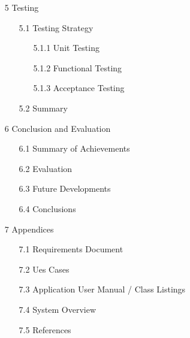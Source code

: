 \documentclass{article}
\begin{document}
\begin{itemize}
\begin{itemize}
\begin{itemize}
		\end{itemize}
	\end{itemize}
	\item [5] Testing
	\begin{itemize}
		\item [5.1] Testing Strategy
		\begin{itemize}
			\item [5.1.1] Unit Testing
			\item [5.1.2] Functional Testing
			\item [5.1.3] Acceptance Testing
		\end{itemize}
		\item [5.2] Summary
	\end{itemize}
	\item [6] Conclusion and Evaluation
	\begin{itemize}
		\item [6.1] Summary of Achievements
		\item [6.2] Evaluation
		\item [6.3] Future Developments
		\item [6.4] Conclusions
	\end{itemize}
	\item [7] Appendices
	\begin{itemize}
		\item [7.1] Requirements Document
		\item [7.2] Ues Cases
		\item [7.3] Application User Manual / Class Listings
		\item [7.4] System Overview
		\item [7.5] References
	\end{itemize}
\end{itemize}
\newpage
\end{document}
